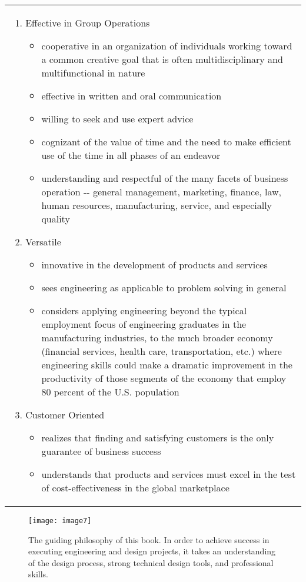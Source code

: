 \begin{longtable}[c]{|m{18cm}|}
\begin{enumerate}
\item Effective in Group Operations
\begin{itemize}
\itemsep0em 
\item  cooperative in an organization of individuals working toward a common
  creative goal that is often multidisciplinary and multifunctional in
  nature
\item  effective in written and oral communication
\item   willing to seek and use expert advice
\item  cognizant of the value of time and the need to make efficient use of
  the time in all phases of an endeavor
\item   understanding and respectful of the many facets of business operation
  -\/- general management, marketing, finance, law, human resources,
  manufacturing, service, and especially quality
\end{itemize}

\item Versatile
\begin{itemize}
\itemsep0em 
\item  innovative in the development of products and services
\item  sees engineering as applicable to problem solving in general
\item  considers applying engineering beyond the typical employment focus of
  engineering graduates in the manufacturing industries, to the much
  broader economy (financial services, health care, transportation,
  etc.) where engineering skills could make a dramatic improvement in
  the productivity of those segments of the economy that employ 80
  percent of the U.S. population
\end{itemize}

\item Customer Oriented 
\begin{itemize}
\itemsep0em 
\item  realizes that finding and satisfying customers is the only guarantee
  of business success
\item  understands that products and services must excel in the test of
  cost-effectiveness in the global marketplace
\end{itemize}
\end{enumerate}
\end{longtable}
\normalsize


\begin{figure}
\texttt{[image: image7]}
\caption{The guiding philosophy of this book. In order to
achieve success in executing engineering and design projects, it takes
an understanding of the design process, strong technical design tools,
and professional skills.}
\label{table:bookPhilosophy}
\end{figure}







